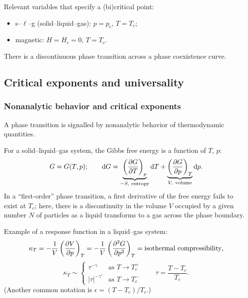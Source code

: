 Relevant variables that specify a (bi)critical point:
\begin{itemize}
  \item s--$\ell$--g (solid--liquid--gas): $p = p_c$, $T = T_c$;
  \item magnetic: $H = H_c = 0$, $T = T_c$.
\end{itemize}
There is a discontinuous phase transition across a phase coexistence curve.

\subsection{Critical exponents and universality}
\subsubsection*{Nonanalytic behavior and critical exponents}

A phase transition is signalled by nonanalytic behavior of thermodynamic
quantities.

For a solid--liquid--gas system, the Gibbs free energy is a function of $T$, $p$:
\begin{equation}
  G = G(T,p);\qquad
  \dd G = \underbrace{\left(\pder{G}{T}\right)_p}_{-S,\ \text{entropy}}\dd T
        + \underbrace{\left(\pder{G}{p}\right)_T}_{V,\ \text{volume}}\dd p.
\end{equation}
In a ``first-order'' phase transition, a first derivative of the free energy fails
to exist at $T_c$; here, there is a discontinuity in the volume $V$ occupied by a
given number $N$ of particles as a liquid transforms to a gas across the phase
boundary.

Example of a response function in a liquid--gas system:
\begin{equation}
  \kappa_T = -\frac{1}{V}\left(\frac{\partial V}{\partial p}\right)_T
  = -\frac{1}{V}\left(\frac{\partial^2 G}{\partial p^2}\right)_T
  = \text{isothermal compressibility},
\end{equation}
\begin{equation}
  \kappa_T \sim
  \begin{cases}
    \tau^{-\gamma} & \text{as } T\to T_c^+\\
    |\tau|^{-\gamma'} & \text{as } T\to T_c^-
  \end{cases}
  \qquad
  \tau = \frac{T-T_c}{T_c}.
\end{equation}
(Another common notation is $\epsilon = (T-T_c)/T_c$.)

